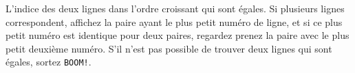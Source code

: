 \begin{Output}
    L'indice des deux lignes dans l'ordre croissant qui sont égales. Si plusieurs lignes correspondent, affichez la paire ayant le plus petit numéro de ligne, et si ce plus petit numéro est identique pour deux paires, regardez prenez la paire avec le plus petit deuxième numéro. S'il n'est pas possible de trouver deux lignes qui sont égales, sortez \texttt{BOOM!}.
\end{Output}
